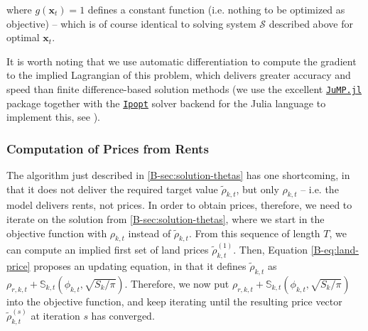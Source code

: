 \documentclass[11pt]{report}
\begin{document}
where $g(\mathbf{x}_t) = 1$ defines a constant function (i.e. nothing to be optimized as objective) -- which is of course identical to solving system $\mathcal{S}$ described above for optimal $\mathbf{x}_t$.

It is worth noting that we use automatic differentiation to compute the gradient to the implied Lagrangian of this problem, which delivers greater accuracy and speed than finite difference-based solution methods (we use the excellent \href{https://jump.dev/JuMP.jl/stable/}{\texttt{JuMP.jl}} package together with the \href{https://coin-or.github.io/Ipopt/}{\texttt{Ipopt}} solver backend for the Julia language to implement this, see \cite{DunningHuchetteLubin2017}).


\subsubsection{Computation of Prices from Rents}\label{B-sec:solution-prices}

The algorithm just described in \ref{B-sec:solution-thetas} has one shortcoming, in that it does not deliver the required target value $\tilde{\rho}_{k,t}$, but only $\rho_{k,t}$ -- i.e. the model delivers rents, not prices. In order to obtain prices, therefore, we need to iterate on the solution from \ref{B-sec:solution-thetas}, where we start in the objective function with $\rho_{k,t}$ instead of $\tilde{\rho}_{k,t}$. From this sequence of length $T$, we can compute an implied first set of land prices $\tilde{\rho}^{(1)}_{k,t}$. Then, Equation \eqref{B-eq:land-price} proposes an updating equation, in that it defines $\tilde{\rho}_{k,t}$ as $\rho_{r,k,t} + \mathbb{S}_{k,t}\left(\phi_{k,t}, \sqrt{S_k/\pi}\right)$. Therefore, we now put $\rho_{r,k,t} + \mathbb{S}_{k,t}\left(\phi_{k,t}, \sqrt{S_k/\pi}\right)$ into the objective function, and keep iterating until the resulting price vector $\tilde{\rho}^{(s)}_{k,t}$ at iteration $s$ has converged.
\end{document}
